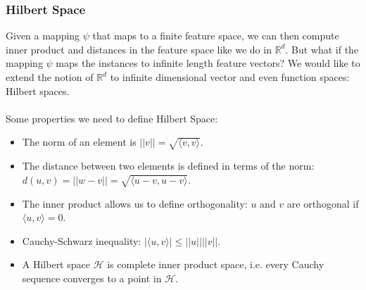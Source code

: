 \documentclass{article}
\begin{document}
   \subsubsection{Hilbert Space}
   Given a mapping $\psi$ that maps to a finite feature space, we can then compute inner product and distances in the feature space like we do in $\mathbb{R}^d$. But what if the mapping $\psi$ maps the instances to infinite length feature vectors? We would like to extend the notion of $\mathbb{R}^d$ to infinite dimensional vector and even function spaces: Hilbert spaces.
   \\\\
   Some properties we need to define Hilbert Space: 
   \begin{itemize}
   \item The norm of an element is $||v||=\sqrt{\langle v, v \rangle}$.
   \item The distance between two elements is defined in terms of the norm: $d(u,v)=||w-v||=\sqrt{\langle u-v, u-v \rangle}$.
   \item The inner product allows us to define orthogonality: $u$ and $v$ are orthogonal if $\langle u, v \rangle = 0$.
   \item Cauchy-Schwarz inequality: $|\langle u,v \rangle| \leq ||u|| ||v||$.
   \item A Hilbert space $\mathcal{H}$ is complete inner product space, i.e. every Cauchy sequence converges to a point in $\mathcal{H}$.
   \end{itemize}
\end{document}
